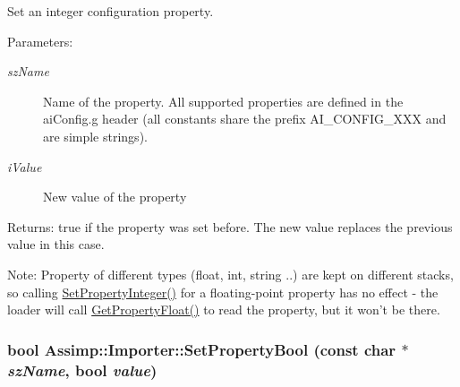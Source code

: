 Set an integer configuration property. \begin{Desc}
\item[Parameters:]
\begin{description}
\item[{\em szName}]Name of the property. All supported properties are defined in the aiConfig.g header (all constants share the prefix AI\_\-CONFIG\_\-XXX and are simple strings). \item[{\em iValue}]New value of the property \end{description}
\end{Desc}
\begin{Desc}
\item[Returns:]true if the property was set before. The new value replaces the previous value in this case. \end{Desc}
\begin{Desc}
\item[Note:]Property of different types (float, int, string ..) are kept on different stacks, so calling \hyperlink{class_assimp_1_1_importer_2542eed3d5f491025c4095b4e55fa068}{SetPropertyInteger()} for a floating-point property has no effect - the loader will call \hyperlink{class_assimp_1_1_importer_dfe1387ccc837fd59bf620e8216637fa}{GetPropertyFloat()} to read the property, but it won't be there. \end{Desc}
\hypertarget{class_assimp_1_1_importer_4af22a88eddf464d949a761149c72825}{
\subsubsection[SetPropertyBool]{\setlength{\rightskip}{0pt plus 5cm}bool Assimp::Importer::SetPropertyBool (const char $\ast$ {\em szName}, \/  bool {\em value})}}
\label{class_assimp_1_1_importer_4af22a88eddf464d949a761149c72825}



